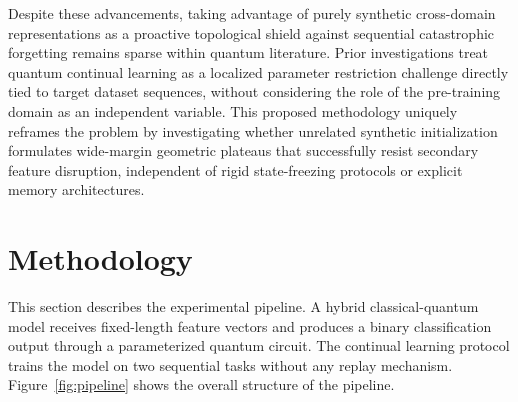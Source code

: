 \documentclass[runningheads]{llncs}
\begin{document}
Despite these advancements, taking advantage of purely synthetic cross-domain representations as a proactive topological shield against sequential catastrophic forgetting remains sparse within quantum literature. Prior investigations treat quantum continual learning as a localized parameter restriction challenge directly tied to target dataset sequences, without considering the role of the pre-training domain as an independent variable. This proposed methodology uniquely reframes the problem by investigating whether unrelated synthetic initialization formulates wide-margin geometric plateaus that successfully resist secondary feature disruption, independent of rigid state-freezing protocols or explicit memory architectures.

\section{Methodology}\label{sec:methodology}

This section describes the experimental pipeline. A hybrid classical-quantum model receives fixed-length feature vectors and produces a binary classification output through a parameterized quantum circuit. The continual learning protocol trains the model on two sequential tasks without any replay mechanism. Figure~\ref{fig:pipeline} shows the overall structure of the pipeline.
\end{document}
